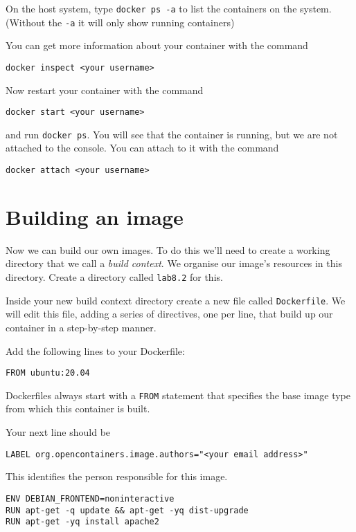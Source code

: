 \documentclass{article}
\begin{document}
On the host system, type \texttt{docker ps -a} to list the containers on the system. (Without the \texttt{-a} it will only
show running containers) 

You can get more information about your container with the command

\begin{verbatim}
docker inspect <your username>
\end{verbatim}

Now restart your container with the command

\begin{verbatim}
docker start <your username>
\end{verbatim}

and run \texttt{docker ps}. You will see that the container is running, but we are not attached to the console. You can attach to it with the command

\begin{verbatim}
docker attach <your username>
\end{verbatim}



\section{Building an image}
Now we can build our own images. To do this we'll need to create a working directory that we call a \emph{build context}. We organise our image's resources in this directory. Create a directory called \texttt{lab8.2} for this.

Inside your new build context directory create a new file called \texttt{Dockerfile}. We will edit this file, adding a series of directives, one per line, that build up our container in a step-by-step manner.

Add the following lines to your Dockerfile:

\texttt{FROM ubuntu:20.04}

Dockerfiles always start with a \texttt{FROM} statement that specifies the base image type from which this container is built.

Your next line should be

\texttt{LABEL org.opencontainers.image.authors="<your email address>"}

This identifies the person responsible for this image.

\begin{verbatim}
ENV DEBIAN_FRONTEND=noninteractive
RUN apt-get -q update && apt-get -yq dist-upgrade
RUN apt-get -yq install apache2
\end{verbatim}
\end{document}
